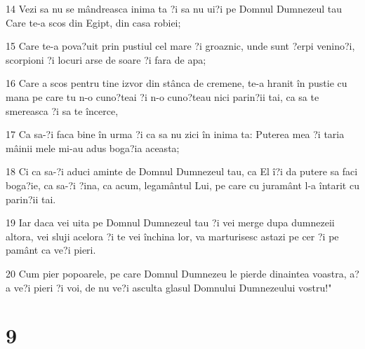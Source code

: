 \par 14 Vezi sa nu se mândreasca inima ta ?i sa nu ui?i pe Domnul Dumnezeul tau Care te-a scos din Egipt, din casa robiei;
\par 15 Care te-a pova?uit prin pustiul cel mare ?i groaznic, unde sunt ?erpi venino?i, scorpioni ?i locuri arse de soare ?i fara de apa;
\par 16 Care a scos pentru tine izvor din stânca de cremene, te-a hranit în pustie cu mana pe care tu n-o cuno?teai ?i n-o cuno?teau nici parin?ii tai, ca sa te smereasca ?i sa te încerce,
\par 17 Ca sa-?i faca bine în urma ?i ca sa nu zici în inima ta: Puterea mea ?i taria mâinii mele mi-au adus boga?ia aceasta;
\par 18 Ci ca sa-?i aduci aminte de Domnul Dumnezeul tau, ca El î?i da putere sa faci boga?ie, ca sa-?i ?ina, ca acum, legamântul Lui, pe care cu juramânt l-a întarit cu parin?ii tai.
\par 19 Iar daca vei uita pe Domnul Dumnezeul tau ?i vei merge dupa dumnezeii altora, vei sluji acelora ?i te vei închina lor, va marturisesc astazi pe cer ?i pe pamânt ca ve?i pieri.
\par 20 Cum pier popoarele, pe care Domnul Dumnezeu le pierde dinaintea voastra, a?a ve?i pieri ?i voi, de nu ve?i asculta glasul Domnului Dumnezeului vostru!"

\chapter{9}


